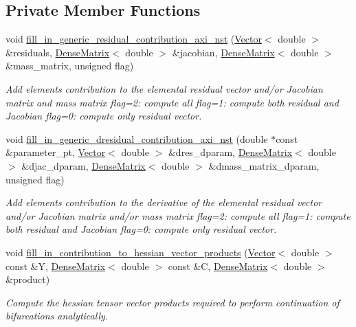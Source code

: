\subsection*{Private Member Functions}
\begin{DoxyCompactItemize}
\item 
void \hyperlink{classoomph_1_1RefineableAxisymmetricNavierStokesEquations_a9ac92aefcee6fd7ef3e7c61af9bd305f}{fill\+\_\+in\+\_\+generic\+\_\+residual\+\_\+contribution\+\_\+axi\+\_\+nst} (\hyperlink{classoomph_1_1Vector}{Vector}$<$ double $>$ \&residuals, \hyperlink{classoomph_1_1DenseMatrix}{Dense\+Matrix}$<$ double $>$ \&jacobian, \hyperlink{classoomph_1_1DenseMatrix}{Dense\+Matrix}$<$ double $>$ \&mass\+\_\+matrix, unsigned flag)
\begin{DoxyCompactList}\small\item\em Add element\textquotesingle{}s contribution to the elemental residual vector and/or Jacobian matrix and mass matrix flag=2\+: compute all flag=1\+: compute both residual and Jacobian flag=0\+: compute only residual vector. \end{DoxyCompactList}\item 
void \hyperlink{classoomph_1_1RefineableAxisymmetricNavierStokesEquations_a649f00dc4b0e086c90ebefb5c72ee481}{fill\+\_\+in\+\_\+generic\+\_\+dresidual\+\_\+contribution\+\_\+axi\+\_\+nst} (double $\ast$const \&parameter\+\_\+pt, \hyperlink{classoomph_1_1Vector}{Vector}$<$ double $>$ \&dres\+\_\+dparam, \hyperlink{classoomph_1_1DenseMatrix}{Dense\+Matrix}$<$ double $>$ \&djac\+\_\+dparam, \hyperlink{classoomph_1_1DenseMatrix}{Dense\+Matrix}$<$ double $>$ \&dmass\+\_\+matrix\+\_\+dparam, unsigned flag)
\begin{DoxyCompactList}\small\item\em Add element\textquotesingle{}s contribution to the derivative of the elemental residual vector and/or Jacobian matrix and/or mass matrix flag=2\+: compute all flag=1\+: compute both residual and Jacobian flag=0\+: compute only residual vector. \end{DoxyCompactList}\item 
void \hyperlink{classoomph_1_1RefineableAxisymmetricNavierStokesEquations_aceeb8beea173139f943043d2dd47bb19}{fill\+\_\+in\+\_\+contribution\+\_\+to\+\_\+hessian\+\_\+vector\+\_\+products} (\hyperlink{classoomph_1_1Vector}{Vector}$<$ double $>$ const \&Y, \hyperlink{classoomph_1_1DenseMatrix}{Dense\+Matrix}$<$ double $>$ const \&C, \hyperlink{classoomph_1_1DenseMatrix}{Dense\+Matrix}$<$ double $>$ \&product)
\begin{DoxyCompactList}\small\item\em Compute the hessian tensor vector products required to perform continuation of bifurcations analytically. \end{DoxyCompactList}\end{DoxyCompactItemize}
